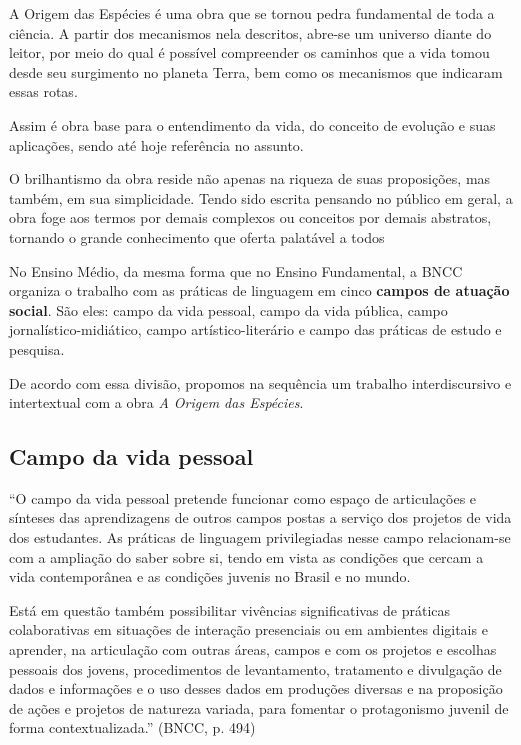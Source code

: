 \documentclass[12pt]{extarticle}
\begin{document}
A Origem das Espécies é uma obra que se tornou pedra fundamental de toda
a ciência. A partir dos mecanismos nela descritos, abre-se um universo diante
do leitor, por meio do qual é possível compreender os caminhos que a vida tomou
desde seu surgimento no planeta Terra, bem como os mecanismos que indicaram
essas rotas.

Assim é obra base para o entendimento da vida, do conceito de evolução e suas
aplicações, sendo até hoje referência no assunto.

O brilhantismo da obra reside não apenas na riqueza de suas proposições, mas
também, em sua simplicidade. Tendo sido escrita pensando no público em geral,
a obra foge aos termos por demais complexos ou conceitos por demais abstratos,
tornando o grande conhecimento que oferta palatável a todos


No Ensino Médio, da mesma forma que no Ensino Fundamental, a BNCC organiza
o trabalho com as práticas de linguagem em cinco \textbf{campos de atuação
social}. São eles: campo da vida pessoal, campo da vida pública, campo
jornalístico-midiático, campo artístico-literário e campo das práticas de
estudo e pesquisa.

De acordo com essa divisão, propomos na sequência um trabalho interdiscursivo
e intertextual com a obra \emph{A Origem das Espécies}.

\subsection{Campo da vida pessoal}

``O campo da vida pessoal pretende funcionar como espaço de articulações
e sínteses das aprendizagens de outros campos postas a serviço dos projetos de
vida dos estudantes. As práticas de linguagem privilegiadas nesse campo
relacionam-se com a ampliação do saber sobre si, tendo em vista as condições
que cercam a vida contemporânea e as condições juvenis no Brasil e no mundo.

Está em questão também possibilitar vivências significativas de práticas
colaborativas em situações de interação presenciais ou em ambientes digitais
e aprender, na articulação com outras áreas, campos e com os projetos
e escolhas pessoais dos jovens, procedimentos de levantamento, tratamento
e divulgação de dados e informações e o uso desses dados em produções diversas
e na proposição de ações e projetos de natureza variada, para fomentar
o protagonismo juvenil de forma contextualizada.'' (BNCC, p. 494)
\end{document}
